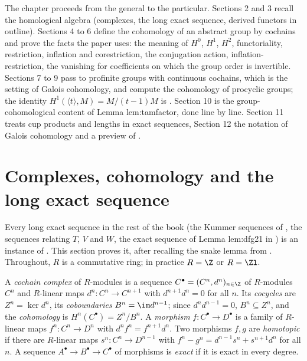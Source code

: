 The chapter proceeds from the general to the particular. Sections 2 and 3 recall the homological algebra (complexes, the long exact sequence,
derived functors in outline). Sections 4 to 6 define the cohomology of an abstract group by cochains and prove the facts the paper uses: the meaning
of $H^0$, $H^1$, $H^2$, functoriality, restriction, inflation and corestriction, the conjugation action, inflation-restriction, the vanishing for
coefficients on which the group order is invertible. Sections 7 to 9 pass to profinite groups with continuous cochains, which is the setting of Galois
cohomology, and compute the cohomology of procyclic groups; the identity $H^1(\langle t\rangle,M)=M/(t-1)M$ is .
Section 10 is the group-cohomological content of Lemma lem:tamfactor, done line by line. Section 11 treats cup products and lengths in exact
sequences, Section 12 the notation of Galois cohomology and a preview of .

\section{Complexes, cohomology and the long exact sequence}\label{sec:cohomology:complexes}

Every long exact sequence in the rest of the book (the Kummer sequences of , the sequences relating $T$, $V$ and $W$, the exact
sequence of Lemma lem:dfg21 in ) is an instance of . This section proves it, after recalling the snake
lemma from . Throughout, $R$ is a commutative ring; in practice $R=\Z$ or $R=\Zl$.

\begin{definition}\label{def:cohomology:complex}
A \emph{cochain complex} of $R$-modules is a sequence $C^\bullet=(C^n,d^n)_{n\in\Z}$ of $R$-modules $C^n$ and $R$-linear maps $d^n\colon C^n\to C^{n+1}$
with $d^{n+1}d^n=0$ for all $n$. Its \emph{cocycles} are $Z^n=\ker d^n$, its \emph{coboundaries} $B^n=\im d^{n-1}$; since $d^nd^{n-1}=0$, $B^n\subseteq Z^n$,
and the \emph{cohomology} is $H^n(C^\bullet)=Z^n/B^n$. A \emph{morphism} $f\colon C^\bullet\to D^\bullet$ is a family of $R$-linear maps $f^n\colon C^n\to D^n$
with $d^nf^n=f^{n+1}d^n$. Two morphisms $f,g$ are \emph{homotopic} if there are $R$-linear maps $s^n\colon C^n\to D^{n-1}$ with
$f^n-g^n=d^{n-1}s^n+s^{n+1}d^n$ for all $n$. A sequence $A^\bullet\to B^\bullet\to C^\bullet$ of morphisms is \emph{exact} if it is exact in every degree.
\end{definition}


